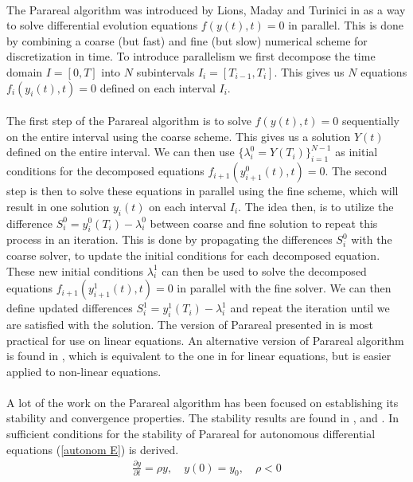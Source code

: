 \noindent
\\
The Parareal algorithm was introduced by Lions, Maday and Turinici in \cite{lions2001resolution} as a way to solve differential evolution equations $f(y(t),t)=0$ in parallel. This is done by combining a coarse (but fast) and fine (but slow) numerical scheme for discretization in time. To introduce parallelism we first decompose the time domain $I=[0,T]$ into $N$ subintervals $I_i=[T_{i-1},T_i]$. This gives us $N$ equations $f_i(y_i(t),t)=0$ defined on each interval $I_i$. 
\\
\\
The first step of the Parareal algorithm is to solve $f(y(t),t)=0$ sequentially on the entire interval using the coarse scheme. This gives us a solution $Y(t)$ defined on the entire interval. We can then use $\{\lambda_i^0=Y(T_i)\}_{i=1}^{N-1}$ as initial conditions for the decomposed equations $f_{i+1}(y_{i+1}^0(t),t)=0$. The second step is then to solve these equations in parallel using the fine scheme, which will result in one solution $y_i(t)$ on each interval $I_i$. The idea then, is to utilize the difference $S_i^0=y_i^0(T_{i})-\lambda_i^0$ between coarse and fine solution to repeat this process in an iteration. This is done by propagating the differences $S_i^0$ with the coarse solver, to update the initial conditions for each decomposed equation. These new initial conditions $\lambda_i^1$ can then be used to solve the decomposed equations $f_{i+1}(y_{i+1}^1(t),t)=0$ in parallel with the fine solver. We can then define updated differences $S_i^1=y_i^1(T_{i})-\lambda_i^1$ and repeat the iteration until we are satisfied with the solution. The version of Parareal presented in \cite{lions2001resolution} is most practical for use on linear equations. An alternative version of Parareal algorithm is found in \cite{baffico2002parallel}, which is equivalent to the one in \cite{lions2001resolution} for linear equations, but is easier applied to non-linear equations.
\\
\\
A lot of the work on the Parareal algorithm has been focused on establishing its stability and convergence properties. The stability results are found in \cite{staff2005stability},\cite{maday2007parareal} and \cite{bal2005convergence}. In \cite{staff2005stability,maday2007parareal} sufficient conditions for the stability of Parareal for autonomous differential equations (\ref{autonom E}) is derived.
\begin{align}
\frac{\partial y}{\partial t} =\rho y,\quad y(0)=y_0,\quad  \rho<0 \label{autonom E}
\end{align}
